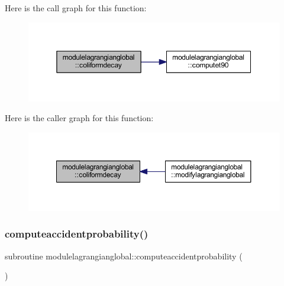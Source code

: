 Here is the call graph for this function\+:\nopagebreak
\begin{figure}[H]
\begin{center}
\leavevmode
\includegraphics[width=350pt]{namespacemodulelagrangianglobal_a1f9b10a52dd3091e18232addf8002dac_cgraph}
\end{center}
\end{figure}
Here is the caller graph for this function\+:\nopagebreak
\begin{figure}[H]
\begin{center}
\leavevmode
\includegraphics[width=350pt]{namespacemodulelagrangianglobal_a1f9b10a52dd3091e18232addf8002dac_icgraph}
\end{center}
\end{figure}
\mbox{\label{namespacemodulelagrangianglobal_ab4d5d4f0cabe63a2e5fc1e9349f8425d}} 
\subsubsection{\texorpdfstring{computeaccidentprobability()}{computeaccidentprobability()}}
{\footnotesize\ttfamily subroutine modulelagrangianglobal\+::computeaccidentprobability (\begin{DoxyParamCaption}{ }\end{DoxyParamCaption})\hspace{0.3cm}{\ttfamily [private]}}

